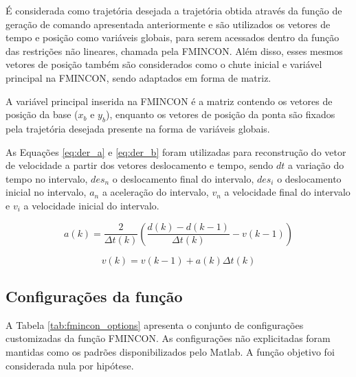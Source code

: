 É considerada como trajetória desejada a trajetória obtida através da função de geração de comando apresentada anteriormente e são utilizados os vetores de tempo e posição como variáveis globais, para serem acessados dentro da função das restrições não lineares, chamada pela FMINCON. Além disso, esses mesmos vetores de posição também são considerados como o chute inicial e variável principal
na FMINCON, sendo adaptados em forma de matriz.

A variável principal inserida na FMINCON é a matriz contendo os vetores de posição da base ($x_b$ e $y_b$), enquanto os vetores de posição da ponta são fixados pela trajetória desejada presente na forma de variáveis globais.

As Equações \ref{eq:der_a} e \ref{eq:der_b} foram utilizadas para reconstrução do vetor de velocidade a partir dos vetores deslocamento e tempo, sendo $dt$ a variação do tempo no intervalo, $des_n$ o deslocamento final do intervalo, $des_i$ o deslocamento inicial no intervalo, $a_n$ a aceleração do intervalo, $v_n$ a velocidade final do intervalo e $v_i$ a velocidade inicial do intervalo. 


\begin{equation}
    \label{eq:der_a}      
        a(k) = \frac{2}{\Delta t(k)} \left( \frac{d(k)-d(k-1)}{\Delta t(k)}-v(k-1) \right)
\end{equation}

\begin{equation}
    \label{eq:der_b}      
        v(k) = v(k-1)+a(k) \Delta t(k)
\end{equation}

\subsection{Configurações da função}

A Tabela \ref{tab:fmincon_options} apresenta o conjunto de configurações customizadas da função FMINCON. As configurações não explicitadas foram mantidas como os padrões disponibilizados pelo Matlab. A função objetivo foi considerada nula por hipótese.

